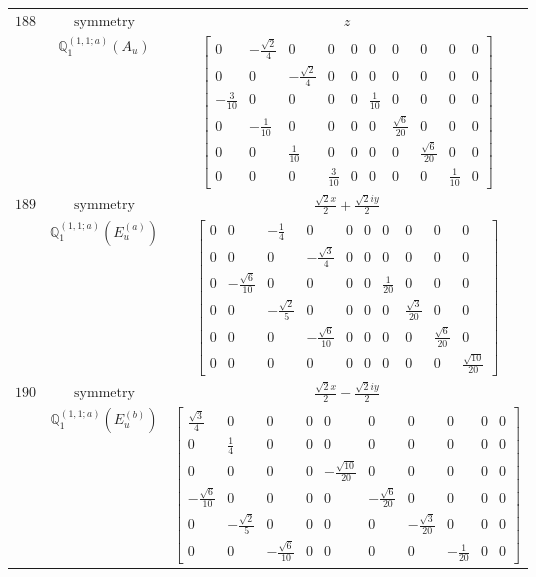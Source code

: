 \documentclass[fleqn,8pt,landscape]{jsarticle}
\begin{document}
\begin{longtable}{ccc}
$ 188 $ & $ \text{symmetry} $ & $ z $ \\
$  $ & $ \mathbb{Q}_{1}^{(1,1;a)}(A_{u}) $ & $ \begin{bmatrix} 0 & - \frac{\sqrt{2}}{4} & 0 & 0 & 0 & 0 & 0 & 0 & 0 & 0 \\ 0 & 0 & - \frac{\sqrt{2}}{4} & 0 & 0 & 0 & 0 & 0 & 0 & 0 \\ - \frac{3}{10} & 0 & 0 & 0 & 0 & \frac{1}{10} & 0 & 0 & 0 & 0 \\ 0 & - \frac{1}{10} & 0 & 0 & 0 & 0 & \frac{\sqrt{6}}{20} & 0 & 0 & 0 \\ 0 & 0 & \frac{1}{10} & 0 & 0 & 0 & 0 & \frac{\sqrt{6}}{20} & 0 & 0 \\ 0 & 0 & 0 & \frac{3}{10} & 0 & 0 & 0 & 0 & \frac{1}{10} & 0 \end{bmatrix} $ \\ \hline
$ 189 $ & $ \text{symmetry} $ & $ \frac{\sqrt{2} x}{2} + \frac{\sqrt{2} i y}{2} $ \\
$  $ & $ \mathbb{Q}_{1}^{(1,1;a)}(E_{u}^{(a)}) $ & $ \begin{bmatrix} 0 & 0 & - \frac{1}{4} & 0 & 0 & 0 & 0 & 0 & 0 & 0 \\ 0 & 0 & 0 & - \frac{\sqrt{3}}{4} & 0 & 0 & 0 & 0 & 0 & 0 \\ 0 & - \frac{\sqrt{6}}{10} & 0 & 0 & 0 & 0 & \frac{1}{20} & 0 & 0 & 0 \\ 0 & 0 & - \frac{\sqrt{2}}{5} & 0 & 0 & 0 & 0 & \frac{\sqrt{3}}{20} & 0 & 0 \\ 0 & 0 & 0 & - \frac{\sqrt{6}}{10} & 0 & 0 & 0 & 0 & \frac{\sqrt{6}}{20} & 0 \\ 0 & 0 & 0 & 0 & 0 & 0 & 0 & 0 & 0 & \frac{\sqrt{10}}{20} \end{bmatrix} $ \\ \hline
$ 190 $ & $ \text{symmetry} $ & $ \frac{\sqrt{2} x}{2} - \frac{\sqrt{2} i y}{2} $ \\
$  $ & $ \mathbb{Q}_{1}^{(1,1;a)}(E_{u}^{(b)}) $ & $ \begin{bmatrix} \frac{\sqrt{3}}{4} & 0 & 0 & 0 & 0 & 0 & 0 & 0 & 0 & 0 \\ 0 & \frac{1}{4} & 0 & 0 & 0 & 0 & 0 & 0 & 0 & 0 \\ 0 & 0 & 0 & 0 & - \frac{\sqrt{10}}{20} & 0 & 0 & 0 & 0 & 0 \\ - \frac{\sqrt{6}}{10} & 0 & 0 & 0 & 0 & - \frac{\sqrt{6}}{20} & 0 & 0 & 0 & 0 \\ 0 & - \frac{\sqrt{2}}{5} & 0 & 0 & 0 & 0 & - \frac{\sqrt{3}}{20} & 0 & 0 & 0 \\ 0 & 0 & - \frac{\sqrt{6}}{10} & 0 & 0 & 0 & 0 & - \frac{1}{20} & 0 & 0 \end{bmatrix} $ \\ \hline

\end{longtable}
\end{document}

